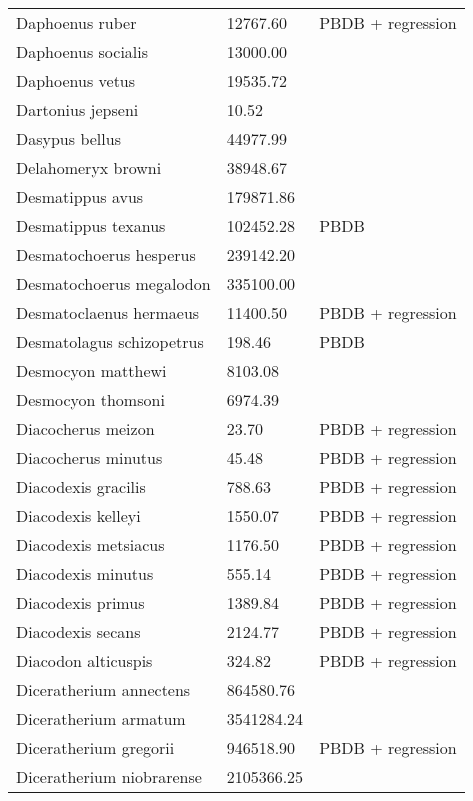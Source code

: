 \documentclass{article}
\begin{document}
\begin{center}
\begin{longtable}{p{} p{} p{}}
    Daphoenus ruber & 12767.60 & PBDB + regression \\ 
    Daphoenus socialis & 13000.00 & \cite{McKenna2011} \\ 
    Daphoenus vetus & 19535.72 & \cite{Tomiya2013} \\ 
    Dartonius jepseni & 10.52 & \cite{Hay1969} \\ 
    Dasypus bellus & 44977.99 & \cite{Smith2004} \\ 
    Delahomeryx browni & 38948.67 & \cite{Tomiya2013} \\ 
    Desmatippus avus & 179871.86 & \cite{Tomiya2013} \\ 
    Desmatippus texanus & 102452.28 & PBDB \\ 
    Desmatochoerus hesperus & 239142.20 & \cite{McGrew1939} \\ 
    Desmatochoerus megalodon & 335100.00 & \cite{McKenna2011} \\ 
    Desmatoclaenus hermaeus & 11400.50 & PBDB + regression \\ 
    Desmatolagus schizopetrus & 198.46 & PBDB \\ 
    Desmocyon matthewi & 8103.08 & \cite{Tomiya2013} \\ 
    Desmocyon thomsoni & 6974.39 & \cite{Tomiya2013} \\ 
    Diacocherus meizon & 23.70 & PBDB + regression \\ 
    Diacocherus minutus & 45.48 & PBDB + regression \\ 
    Diacodexis gracilis & 788.63 & PBDB + regression \\ 
    Diacodexis kelleyi & 1550.07 & PBDB + regression \\ 
    Diacodexis metsiacus & 1176.50 & PBDB + regression \\ 
    Diacodexis minutus & 555.14 & PBDB + regression \\ 
    Diacodexis primus & 1389.84 & PBDB + regression \\ 
    Diacodexis secans & 2124.77 & PBDB + regression \\ 
    Diacodon alticuspis & 324.82 & PBDB + regression \\ 
    Diceratherium annectens & 864580.76 & \cite{Tomiya2013} \\ 
    Diceratherium armatum & 3541284.24 & \cite{Tomiya2013} \\ 
    Diceratherium gregorii & 946518.90 & PBDB + regression \\ 
    Diceratherium niobrarense & 2105366.25 & \cite{Tomiya2013} \\ 

\end{longtable}
\end{center}
\end{document}
